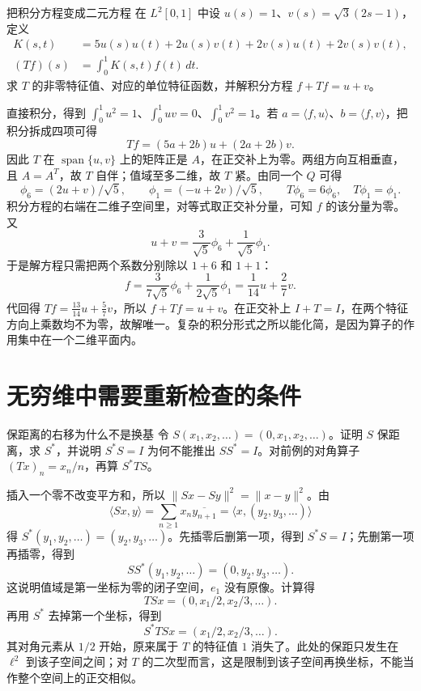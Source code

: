 \begin{example}{把积分方程变成二元方程}
在 \(L^2[0,1]\) 中设 \(u(s)=1\)、\(v(s)=\sqrt3(2s-1)\)，定义
\begin{align*}
 K(s,t)&=5u(s)u(t)+2u(s)v(t)+2v(s)u(t)+2v(s)v(t),\\
 (Tf)(s)&=\int_0^1K(s,t)f(t)\,dt.
\end{align*}
求 \(T\) 的非零特征值、对应的单位特征函数，并解积分方程 \(f+Tf=u+v\)。
\end{example}
\begin{solution}
直接积分，得到 \(\int_0^1 u^2=1\)、\(\int_0^1uv=0\)、\(\int_0^1 v^2=1\)。若 \(a=\langle f,u\rangle\)、\(b=\langle f,v\rangle\)，把积分拆成四项可得
\[
 Tf=(5a+2b)u+(2a+2b)v.
\]
因此 \(T\) 在 \(\operatorname{span}\{u,v\}\) 上的矩阵正是 \(A\)，在正交补上为零。两组方向互相垂直，且 \(A=A^T\)，故 \(T\) 自伴；值域至多二维，故 \(T\) 紧。由同一个 \(Q\) 可得
\[
 \phi_6=(2u+v)/\sqrt5,\qquad
 \phi_1=(-u+2v)/\sqrt5,\qquad
 T\phi_6=6\phi_6,\quad T\phi_1=\phi_1.
\]
积分方程的右端在二维子空间里，对等式取正交补分量，可知 \(f\) 的该分量为零。又
\[
 u+v=\frac3{\sqrt5}\phi_6+\frac1{\sqrt5}\phi_1.
\]
于是解方程只需把两个系数分别除以 \(1+6\) 和 \(1+1\)：
\[
 f=\frac3{7\sqrt5}\phi_6+\frac1{2\sqrt5}\phi_1
 =\frac1{14}u+\frac27v.
\]
代回得 \(Tf=\frac{13}{14}u+\frac57v\)，所以 \(f+Tf=u+v\)。在正交补上 \(I+T=I\)，在两个特征方向上乘数均不为零，故解唯一。复杂的积分形式之所以能化简，是因为算子的作用集中在一个二维平面内。
\end{solution}

\section{无穷维中需要重新检查的条件}

\begin{example}{保距离的右移为什么不是换基}
令 \(S(x_1,x_2,\ldots)=(0,x_1,x_2,\ldots)\)。证明 \(S\) 保距离，求 \(S^*\)，并说明 \(S^*S=I\) 为何不能推出 \(SS^*=I\)。对前例的对角算子 \((Tx)_n=x_n/n\)，再算 \(S^*TS\)。
\end{example}
\begin{solution}
插入一个零不改变平方和，所以 \(\|Sx-Sy\|^2=\|x-y\|^2\)。由
\[
 \langle Sx,y\rangle
 =\sum_{n\geq1}x_n\overline{y_{n+1}}
 =\langle x,(y_2,y_3,\ldots)\rangle
\]
得 \(S^*(y_1,y_2,\ldots)=(y_2,y_3,\ldots)\)。先插零后删第一项，得到 \(S^*S=I\)；先删第一项再插零，得到
\[
 SS^*(y_1,y_2,\ldots)=(0,y_2,y_3,\ldots).
\]
这说明值域是第一坐标为零的闭子空间，\(e_1\) 没有原像。计算得
\[
TSx=(0,x_1/2,x_2/3,\ldots).
\]
再用 \(S^*\) 去掉第一个坐标，得到
\[
 S^*TSx=(x_1/2,x_2/3,\ldots).
\]
其对角元素从 \(1/2\) 开始，原来属于 \(T\) 的特征值 \(1\) 消失了。此处的保距只发生在 \(\ell^2\) 到该子空间之间；对 \(T\) 的二次型而言，这是限制到该子空间再换坐标，不能当作整个空间上的正交相似。
\end{solution}

